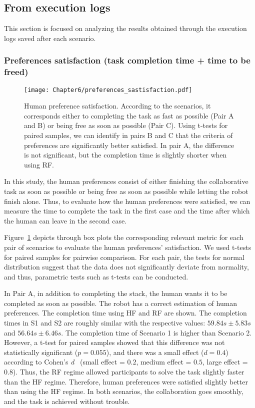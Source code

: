 \subsection{From execution logs}

This section is focused on analyzing the results obtained through the execution logs saved after each scenario. 

\subsubsection*{Preferences satisfaction (task completion time + time to be freed)}

\begin{figure}
    \center
    \texttt{[image: Chapter6/preferences\_sastisfaction.pdf]}
    \caption{Human preference satisfaction. According to the scenarios, it corresponds either to completing the task as fast as possible (Pair A and B) or being free as soon as possible (Pair C). Using t-tests for paired samples, we can identify in pairs B and C that the criteria of preferences are significantly better satisfied. In pair A, the difference is not significant, but the completion time is slightly shorter when using RF.}
    \label{fig:preferences_satisfaction}
\end{figure}

In this study, the human preferences consist of either finishing the collaborative task as soon as possible or being free as soon as possible while letting the robot finish alone. 
Thus, to evaluate how the human preferences were satisfied, we can measure the time to complete the task in the first case and the time after which the human can leave in the second case. 

Figure~\ref{fig:preferences_satisfaction} depicts through box plots the corresponding relevant metric for each pair of scenarios to evaluate the human preferences' satisfaction. We used t-tests for paired samples for pairwise comparison. For each pair, the tests for normal distribution suggest that the data does not significantly deviate from normality, and thus, parametric tests such as t-tests can be conducted.

In Pair A, in addition to completing the stack, the human wants it to be completed as soon as possible. The robot has a correct estimation of human preferences. The completion time using HF and RF are shown. The completion times in S1 and S2 are roughly similar with the respective values: $59.84s \pm 5.83s$ and $56.64s \pm 6.46s$. The completion time of Scenario 1 is higher than Scenario 2. However, a t-test for paired samples showed that this difference was not statistically significant ($p = 0.055$), and there was a small effect ($d = 0.4$) according to Cohen's \textit{d}~\cite{cohen1988concepts} (small effect = $0.2$, medium effect = $0.5$, large effect = $0.8$). Thus, the RF regime allowed participants to solve the task slightly faster than the HF regime. Therefore, human preferences were satisfied slightly better than using the HF regime. 
In both scenarios, the collaboration goes smoothly, and the task is achieved without trouble.

